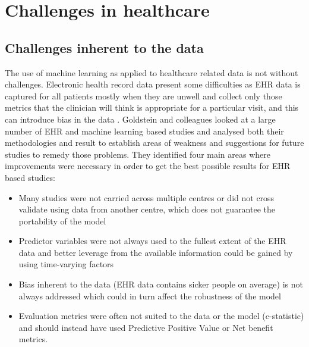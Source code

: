 \section{Challenges in healthcare}
\subsection{Challenges inherent to the data}
The use of machine learning as applied to healthcare related data is not without challenges. 
Electronic health record data present some difficulties as EHR data is captured for all patients mostly when they are unwell and collect only those metrics that the clinician will think is appropriate for a particular visit, and this can introduce bias in the data \citep{Hersh:2013gp, Goldstein:2017bk}. \newline 
Goldstein and colleagues looked at a large number of EHR and machine learning based studies and analysed both their methodologies and result to  establish areas of weakness and suggestions for future studies to remedy those problems. They identified four main areas where improvements were necessary in order to get the best possible results for EHR based studies: 
\begin{itemize}
    \item Many studies were not carried across multiple centres or did not cross validate using data from another centre, which does not guarantee the portability of the model 
    \item Predictor variables were not always used to the fullest extent of the EHR data and better leverage from the available information could be gained by using time-varying factors
    \item Bias inherent to the data (EHR data contains sicker people on average) is not always addressed which could in turn affect the robustness of the model
    \item Evaluation metrics were often not suited to the data or the model (c-statistic) and should instead have used Predictive Positive Value or Net benefit metrics. 
\end{itemize}

